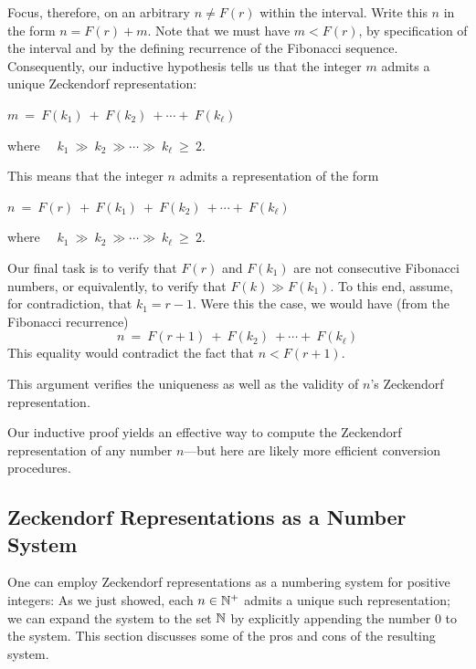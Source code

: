 \smallskip

Focus, therefore, on an arbitrary $n \neq F(r)$ within the interval.  Write this $n$ in the form $n = F(r) + m$.  Note that we must have $m < F(r)$, by specification of the interval and by the defining recurrence of the Fibonacci sequence.  Consequently, our inductive hypothesis tells us that the integer $m$ admits a unique Zeckendorf representation:

\hspace*{.25in} $m \ = \ F(k_1) \ + \ F(k_2) \ + \cdots + \ F(k_\ell)$

\smallskip

\noindent
where \ \ $k_1 \ \gg \ k_2 \ \gg \cdots \gg \ k_\ell \ \geq \ 2$.

\smallskip

\noindent
This means that the integer $n$ admits a representation of the form

\hspace*{.25in} $n \ = \ F(r) \ + \ F(k_1) \ + \ F(k_2) \ + \cdots + \ F(k_\ell)$

\smallskip

\noindent
where \ \ $k_1 \ \gg \ k_2 \ \gg \cdots \gg \ k_\ell \ \geq \ 2$.

\smallskip 

Our final task is to verify that $F(r)$ and $F(k_1)$ are not consecutive Fibonacci numbers, or equivalently, to verify that $F(k) \gg F(k_1)$.  To this end, assume, for contradiction, that $k_1=r-1$.  Were this the case, we would have (from the Fibonacci recurrence)
\[ n \ = \ F(r+1) \ + \ F(k_2) \ + \cdots + \ F(k_\ell) \]
This equality would contradict the fact that $n < F(r+1)$.

\smallskip

This argument verifies the uniqueness as well as the validity of $n$'s Zeckendorf representation.

\medskip

Our inductive proof yields an effective way to compute the Zeckendorf representation of any number $n$---but here are likely more efficient conversion procedures.

\subsection{Zeckendorf Representations as a Number System}
\label{sec:Zeck-rep-number-system}

One can employ Zeckendorf representations as a numbering system for positive integers:  As we just showed, each $n \in \mathbb{N}^+$ admits a unique such representation; we can expand the system to the set $\mathbb{N}$ by explicitly appending the number $0$ to the system.  This section discusses some of the pros and cons of the resulting system.

